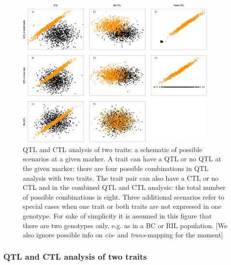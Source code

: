   \begin{figure}[h!]
  \centering
  \includegraphics[width=0.9\textwidth]{eps/image_4_1.eps}
  \caption[CTLs.]{QTL and CTL analysis of two traits: a schematic of possible scenarios at a given marker. A trait can 
          have a QTL or no QTL at the given marker: there are four possible combinations in QTL analysis with two traits. 
          The trait pair can also have a CTL or no CTL and in the combined QTL and CTL analysis: the total number of possible 
          combinations is eight. Three additional scenarios refer to special cases when one trait or both traits are not 
          expressed in one genotype. For sake of simplicity it is assumed in this figure that there are two genotypes only, 
          e.g. as in a BC or RIL population. [We also ignore possible info on \emph{cis}- and \emph{trans}-mapping for the moment]}
          \label{fig:ctls}
  \end{figure}

  \subsubsection{QTL and CTL analysis of two traits}
  
